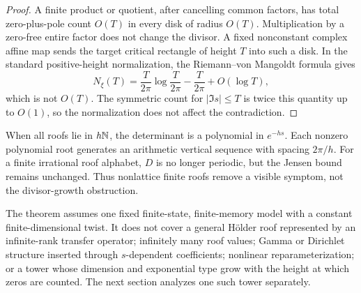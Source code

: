 \begin{proof}
A finite product or quotient, after cancelling common factors, has total
zero-plus-pole count \(O(T)\) in every disk of radius \(O(T)\).
Multiplication by a zero-free entire factor does not change the divisor. A
fixed nonconstant complex affine map sends the target critical rectangle of
height \(T\) into such a disk. In the standard positive-height normalization,
the Riemann--von Mangoldt formula gives
\[
N_\xi(T)=
\frac{T}{2\pi}\log\frac{T}{2\pi}
-\frac{T}{2\pi}+O(\log T),
\]
which is not \(O(T)\).
The symmetric count for \(|\Im s|\le T\) is twice this quantity up to
\(O(1)\), so the normalization does not affect the contradiction.
\end{proof}

When all roofs lie in \(h\mathbb{N}\), the determinant is a polynomial in
\(e^{-hs}\). Each nonzero polynomial root generates an arithmetic vertical
sequence with spacing \(2\pi/h\). For a finite irrational roof alphabet,
\(D\) is no longer periodic, but the Jensen bound remains unchanged. Thus
nonlattice finite roofs remove a visible symptom, not the divisor-growth
obstruction.

\begin{remark}
The theorem assumes one fixed finite-state, finite-memory model with a
constant finite-dimensional twist. It does not cover a general H{\"o}lder
roof represented by an infinite-rank transfer operator; infinitely many roof
values; Gamma or Dirichlet structure inserted through \(s\)-dependent
coefficients; nonlinear reparameterization; or a tower whose dimension and
exponential type grow with the height at which zeros are counted. The next
section analyzes one such tower separately.
\end{remark}
